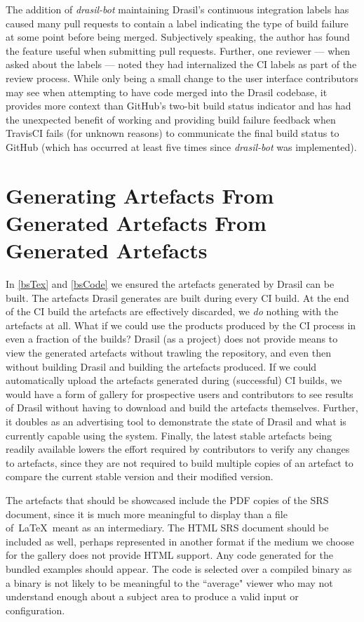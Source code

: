 {{{{{The addition of \textit{drasil-bot} maintaining Drasil's continuous integration labels has caused many pull requests to contain a label indicating the type of build failure at some point before being merged. Subjectively speaking, the author has found the feature useful when submitting pull requests. Further, one reviewer --- when asked about the labels --- noted they had internalized the CI labels as part of the review process. While only being a small change to the user interface contributors may see when attempting to have code merged into the Drasil codebase, it provides more context than GitHub's two-bit build status indicator and has had the unexpected benefit of working and providing build failure feedback when TravisCI fails (for unknown reasons) to communicate the final build status to GitHub (which has occurred at least five times since \textit{drasil-bot} was implemented).

\section{Generating Artefacts From Generated Artefacts From Generated Artefacts}\label{bsCD}

In \autoref{bsTex} and \autoref{bsCode} we ensured the artefacts generated by Drasil can be built. The artefacts Drasil generates are built during every CI build. At the end of the CI build the artefacts are effectively discarded, we \textit{do} nothing with the artefacts at all. What if we could use the products produced by the CI process in even a fraction of the builds? Drasil (as a project) does not provide means to view the generated artefacts without trawling the repository, and even then without building Drasil and building the artefacts produced. If we could automatically upload the artefacts generated during (successful) CI builds, we would have a form of gallery for prospective users and contributors to see results of Drasil without having to download and build the artefacts themselves. Further, it doubles as an advertising tool to demonstrate the state of Drasil and what is currently capable using the system. Finally, the latest stable artefacts being readily available lowers the effort required by contributors to verify any changes to artefacts, since they are not required to build multiple copies of an artefact to compare the current stable version and their modified version.

The artefacts that should be showcased include the PDF copies of the SRS document, since it is much more meaningful to display than a file of\ \LaTeX\ meant as an intermediary. The HTML SRS document should be included as well, perhaps represented in another format if the medium we choose for the gallery does not provide HTML support. Any code generated for the bundled examples should appear. The code is selected over a compiled binary as a binary is not likely to be meaningful to the ``average" viewer who may not understand enough about a subject area to produce a valid input or configuration.

}}}}}
